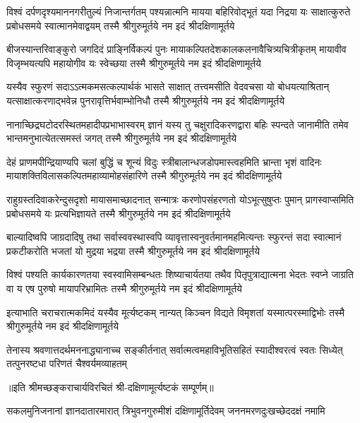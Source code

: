 

\fourlineindentedshloka
{विश्वं दर्पणदृश्यमाननगरीतुल्यं निजान्तर्गतम्}
{पश्यन्नात्मनि मायया बहिरिवोद्भूतं यदा निद्रया}
{यः साक्षात्कुरुते प्रबोधसमये स्वात्मानमेवाद्वयम्}
{तस्मै श्रीगुरुमूर्तये नम इदं श्रीदक्षिणामूर्तये}

\fourlineindentedshloka
{बीजस्यान्तरिवाङ्कुरो जगदिदं प्राङ्\mbox{}निर्विकल्पं पुनः}
{मायाकल्पितदेशकालकलनावैचित्र्यचित्रीकृतम्}
{मायावीव विजृम्भयत्यपि महायोगीव यः स्वेच्छया}
{तस्मै श्रीगुरुमूर्तये नम इदं श्रीदक्षिणामूर्तये}

\fourlineindentedshloka
{यस्यैव स्फुरणं सदाऽऽत्मकमसत्कल्पार्थकं भासते}
{साक्षात् तत्त्वमसीति वेदवचसा यो बोधयत्याश्रितान्}
{यत्साक्षात्करणाद्भवेन्न पुनरावृत्तिर्भवाम्भोनिधौ}
{तस्मै श्रीगुरुमूर्तये नम इदं श्रीदक्षिणामूर्तये}

\fourlineindentedshloka
{नानाच्छिद्रघटोदरस्थितमहादीपप्रभाभास्वरम्}
{ज्ञानं यस्य तु चक्षुरादिकरणद्वारा बहिः स्पन्दते}
{जानामीति तमेव भान्तमनुभात्येतत्समस्तं जगत्}
{तस्मै श्रीगुरुमूर्तये नम इदं श्रीदक्षिणामूर्तये}

\fourlineindentedshloka
{देहं प्राणमपीन्द्रियाण्यपि चलां बुद्धिं च शून्यं विदुः}
{स्त्रीबालान्धजडोपमास्त्वहमिति भ्रान्ता भृशं वादिनः}
{मायाशक्तिविलासकल्पितमहाव्यामोहसंहारिणे}
{तस्मै श्रीगुरुमूर्तये नम इदं श्रीदक्षिणामूर्तये}

\fourlineindentedshloka
{राहुग्रस्तदिवाकरेन्दुसदृशो मायासमाच्छादनात्}
{सन्मात्रः करणोपसंहरणतो योऽभूत्सुषुप्तः पुमान्}
{प्रागस्वाप्समिति प्रबोधसमये यः प्रत्यभिज्ञायते}
{तस्मै श्रीगुरुमूर्तये नम इदं श्रीदक्षिणामूर्तये}

\fourlineindentedshloka
{बाल्यादिष्वपि जाग्रदादिषु तथा सर्वास्ववस्थास्वपि}
{व्यावृत्तास्वनुवर्तमानमहमित्यन्तः स्फुरन्तं सदा}
{स्वात्मानं प्रकटीकरोति भजतां यो मुद्रया भद्रया}
{तस्मै श्रीगुरुमूर्तये नम इदं श्रीदक्षिणामूर्तये}

\fourlineindentedshloka
{विश्वं पश्यति कार्यकारणतया स्वस्वामिसम्बन्धतः}
{शिष्याचार्यतया तथैव पितृपुत्राद्यात्मना भेदतः}
{स्वप्ने जाग्रति वा य एष पुरुषो मायापरिभ्रामितः}
{तस्मै श्रीगुरुमूर्तये नम इदं श्रीदक्षिणामूर्तये}

{इत्याभाति चराचरात्मकमिदं यस्यैव मूर्त्यष्टकम्}
{नान्यत् किञ्चन विद्यते विमृशतां यस्मात्परस्माद्विभोः}
{तस्मै श्रीगुरुमूर्तये नम इदं श्रीदक्षिणामूर्तये}

{तेनास्य श्रवणात्तदर्थमननाद्ध्यानाच्च सङ्कीर्तनात्}
{सर्वात्मत्वमहाविभूतिसहितं स्यादीश्वरत्वं स्वतः}
{सिध्येत् तत्पुनरष्टधा परिणतं चैश्वर्यमव्याहतम्}

॥इति श्रीमच्छङ्कराचार्यविरचितं श्री-दक्षिणामूर्त्यष्टकं सम्पूर्णम्॥

\closesection
{}
{सकलमुनिजनानां ज्ञानदातारमारात्}
{त्रिभुवनगुरुमीशं दक्षिणामूर्तिदेवम्}
{जननमरणदुःखच्छेददक्षं नमामि}